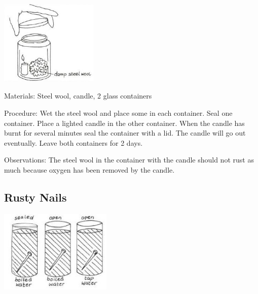 \begin{multicols}{2}
\begin{center}
\includegraphics[width=0.35\textwidth]{./img/vso/rusting-steel-wool.jpg}
\end{center}

\begin{description*}
\item[Materials:]{Steel wool, candle, 2 glass containers}
\item[Procedure:]{Wet the steel wool and place some in each container. Seal one
container. Place a lighted candle in the other container. When the
candle has burnt for several minutes seal the container with a lid. The
candle will go out eventually. Leave both containers for 2 days. }
\item[Observations:]{The
steel wool in the container with the candle should not rust as much
because oxygen has been removed by the candle.}
\end{description*}

\columnbreak

\subsection{Rusty Nails}

\begin{center}
\includegraphics[width=0.4\textwidth]{./img/vso/rusty-nails.jpg}
\end{center}


\end{multicols}
